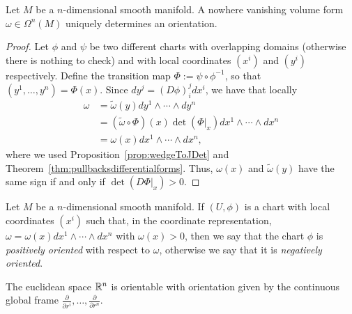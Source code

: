 \begin{theorem}
  Let $M$ be a $n$-dimensional smooth manifold.
  A nowhere vanishing volume form $\omega\in\Omega^n(M)$ uniquely determines an orientation.
\end{theorem}
\begin{proof}
  Let $\phi$ and $\psi$ be two different charts with overlapping domains (otherwise there is nothing to check) and with local coordinates $(x^i)$ and $(y^i)$ respectively.
  Define the transition map $\Phi := \psi\circ\phi^{-1}$, so that $(y^1,\ldots,y^n) = \Phi(x)$.
  Since $d y^j = (D\phi)_i^j dx^i$, we have that locally
  \begin{align}
    \omega &= \widetilde \omega (y) dy^1\wedge\cdots\wedge dy^n \\
    &= (\widetilde\omega \circ \Phi)(x) \det(\Phi|_x) dx^{1}\wedge\cdots\wedge dx^{n} \\
    &= \omega(x) dx^{1}\wedge\cdots\wedge dx^{n},
  \end{align}
  where we used Proposition~\ref{prop:wedgeToJDet} and Theorem~\ref{thm:pullbacksdifferentialforms}.
  Thus, $\omega(x)$ and $\widetilde\omega(y)$ have the same sign if and only if $\det(D\Phi|_x) > 0$.
\end{proof}

\begin{definition}
  Let $M$ be a $n$-dimensional smooth manifold.
  If $(U,\phi)$ is a chart with local coordinates $(x^i)$ such that, in the coordinate representation, $\omega = \omega(x) dx^1\wedge\cdots\wedge dx^n$ with $\omega(x) > 0$, then we say that the chart $\phi$ is \emph{positively oriented} with respect to $\omega$, otherwise we say that it is \emph{negatively oriented}.  
\end{definition}

\begin{example}
  The euclidean space $\mathbb{R}^n$ is orientable with orientation given by the continuous global frame $\frac{\partial}{\partial r^i},\ldots,\frac{\partial}{\partial r^n}$.
\end{example}

